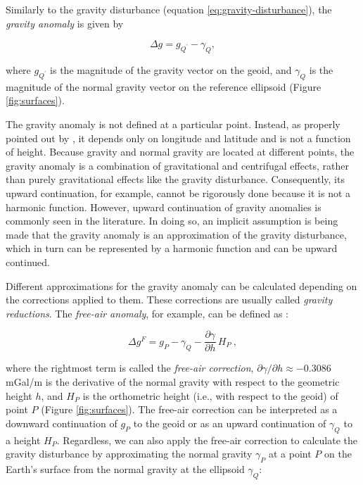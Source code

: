 \documentclass[paper,twocolumn,twoside]{geophysics}
\begin{document}
Similarly to the gravity disturbance (equation \ref{eq:gravity-disturbance}),
the \textit{gravity anomaly} is given by

\begin{equation}
\Delta g = g_{Q^{\prime}} - \gamma_{Q} ,
\label{eq:gravity-anomaly}
\end{equation}

\noindent
where $g_{Q^{\prime}}$ is the magnitude of the gravity vector on the geoid,
and $\gamma_{Q}$ is the magnitude of the normal gravity vector
on the reference ellipsoid (Figure \ref{fig:surfaces}).

The gravity anomaly is not defined at a particular point.
Instead, as properly pointed out by \citet{barthelmes2013},
it depends only on longitude and latitude and is not a function of height.
Because gravity and normal gravity are located at different points,
the gravity anomaly is a combination of gravitational and centrifugal effects,
rather than purely gravitational effects like the gravity disturbance.
Consequently, its upward continuation, for example, cannot be rigorously done
because it is not a harmonic function.
However, upward continuation of gravity anomalies is commonly seen in the
literature.
In doing so, an implicit assumption is being made that the gravity anomaly is
an approximation of the gravity disturbance,
which in turn can be represented by a harmonic function and can be upward
continued.

Different approximations for the gravity anomaly can be calculated
depending on the corrections applied to them.
These corrections are usually called \textit{gravity reductions}.
The \textit{free-air anomaly}, for example, can be defined as
\citep{blakely1996, hofmann-wellenhof-moritz2005}:

\begin{equation}
\Delta g^{F} = g_{P}
- \gamma_{Q} - \frac{\partial \gamma}{\partial h} \, H_{P} \: ,
\label{eq:free-air-anomaly}
\end{equation}

\noindent
where the rightmost term is called the \textit{free-air correction},
$\partial \gamma/\partial h \approx -0.3086$ mGal/m is the
derivative of the normal gravity with respect to the geometric height $h$,
and $H_{P}$ is the orthometric height (i.e., with respect to the geoid)
of point $P$ (Figure \ref{fig:surfaces}).
The free-air correction can be interpreted as a downward continuation of
$g_P$ to the geoid or as an upward continuation of $\gamma_Q$ to a height
$H_P$.
Regardless, we can also apply the free-air correction
to calculate the gravity disturbance by
approximating the normal gravity $\gamma_{P}$
at a point $P$ on the Earth's surface
from the normal gravity at the ellipsoid $\gamma_{Q}$:
\end{document}
